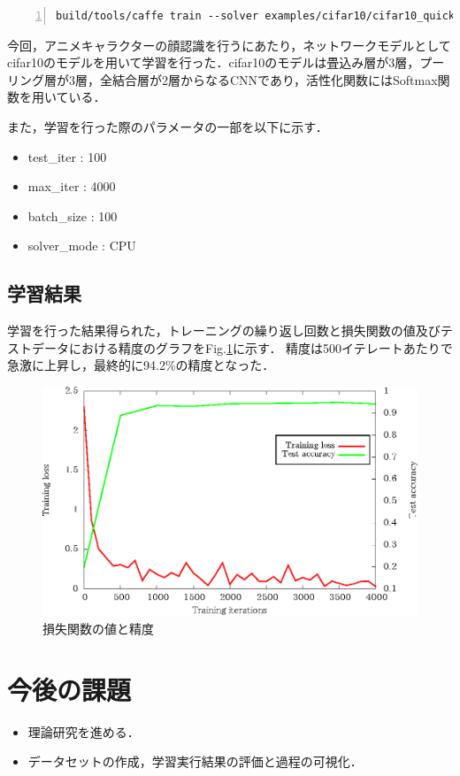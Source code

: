\documentclass[a4paper,10pt]{jsarticle}
\begin{document}
\begin{lstlisting}[basicstyle=\ttfamily\footnotesize, frame=single, tabsize=2,showtabs,firstnumber=1, numbers=left, breaklines=true]
build/tools/caffe train --solver examples/cifar10/cifar10_quick_solver.prototxt
\end{lstlisting}

今回，アニメキャラクターの顔認識を行うにあたり，ネットワークモデルとしてcifar10のモデルを用いて学習を行った．cifar10のモデルは畳込み層が3層，プーリング層が3層，全結合層が2層からなるCNNであり，活性化関数にはSoftmax関数を用いている．

また，学習を行った際のパラメータの一部を以下に示す．
\begin{itemize}
 \item test\_iter : 100
 \item max\_iter : 4000
 \item batch\_size : 100
 \item solver\_mode : CPU
\end{itemize}

\subsection{学習結果}
学習を行った結果得られた，トレーニングの繰り返し回数と損失関数の値及びテストデータにおける精度のグラフをFig.\ref{210045_15Jul15}に示す．
精度は500イテレートあたりで急激に上昇し，最終的に94.2\%の精度となった．

\begin{figure}[ht]
 \centering
 \includegraphics[scale=1.0]{fig/eps/result_train_test_graph.eps}
 \caption{損失関数の値と精度 }
 \label{210045_15Jul15}
\end{figure}

\section{今後の課題}
\begin{itemize}
 \item 理論研究を進める．
 \item データセットの作成，学習実行結果の評価と過程の可視化．
\end{itemize}
\end{document}
